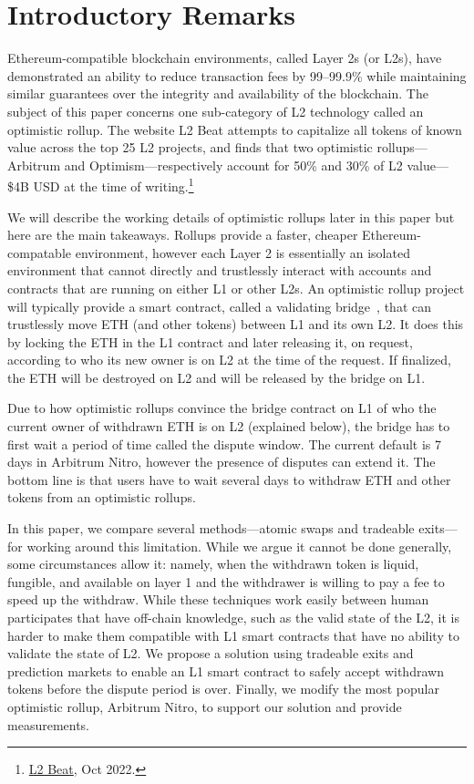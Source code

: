 \section{Introductory Remarks}

Ethereum-compatible blockchain environments, called Layer 2s (or L2s), have demonstrated an ability to reduce transaction fees by 99--99.9\% while maintaining similar guarantees over the integrity and availability of the blockchain. The subject of this paper concerns one sub-category of L2 technology called an optimistic rollup. The website L2 Beat attempts to capitalize all tokens of known value across the top 25 L2 projects, and finds that two optimistic rollups---Arbitrum and Optimism---respectively account for 50\% and 30\% of L2 value---\$4B USD at the time of writing.\footnote{\href{https://l2beat.com/scaling/tvl/}{L2 Beat}, Oct 2022.}

We will describe the working details of optimistic rollups later in this paper but here are the main takeaways. Rollups provide a faster, cheaper Ethereum-compatable environment, however each Layer 2 is essentially an isolated environment that cannot directly and trustlessly interact with accounts and contracts that are running on either L1 or other L2s. An optimistic rollup project will typically provide a smart contract, called a validating bridge~\cite{}, that can trustlessly move ETH (and other tokens) between L1 and its own L2. It does this by locking the ETH in the L1 contract and later releasing it, on request, according to who its new owner is on L2 at the time of the request. If finalized, the ETH will be destroyed on L2 and will be released by the bridge on L1.

Due to how optimistic rollups convince the bridge contract on L1 of who the current owner of withdrawn ETH is on L2 (explained below), the bridge has to first wait a period of time called the dispute window. The current default is 7 days in Arbitrum Nitro, however the presence of disputes can extend it. The bottom line is that users have to wait several days to withdraw ETH and other tokens from an optimistic rollups. 

In this paper, we compare several methods---atomic swaps and tradeable exits---for working around this limitation. While we argue it cannot be done generally, some circumstances allow it: namely, when the withdrawn token is liquid, fungible, and available on layer 1 and the withdrawer is willing to pay a fee to speed up the withdraw. While these techniques work easily between human participates that have off-chain knowledge, such as the valid state of the L2, it is harder to make them compatible with L1 smart contracts that have no ability to validate the state of L2. We propose a solution using tradeable exits and prediction markets to enable an L1 smart contract to safely accept withdrawn tokens before the dispute period is over. Finally, we modify the most popular optimistic rollup, Arbitrum Nitro, to support our solution and provide measurements. 
 
